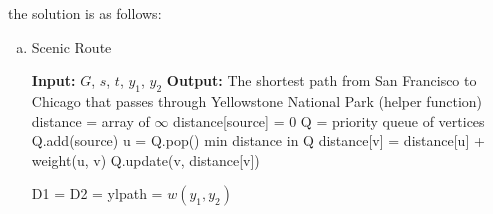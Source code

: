 \documentclass[10pt]{article}
\begin{document}
\begin{solution}
    the solution is as follows:
    \begin{enumerate}[(a)] 
        \item  \begin{algorithm}
            \caption{Scenic Route} 
            \begin{algorithmic}[1]
            \Statex \textbf{Input:} $G$, $s$, $t$, $y_1$, $y_2$
            \Statex \textbf{Output:} The shortest path from San Francisco to Chicago that passes through Yellowstone National Park
            \Statex 
             (helper function)
                \State distance = array of $\infty$ 
                \State distance[source] = 0
                \State Q = priority queue of vertices
                \State Q.add(source)
                    \State u = Q.pop() min distance in Q
                            \State distance[v] = distance[u] + weight(u, v)
                            \State Q.update(v, distance[v])
                        \EndIf
                    \EndFor
                \EndWhile

            \EndFunction
            \Statex
                \State D1 = 
                \State D2 = 
                \State ylpath = $w(y_1, y_2)$


\end{algorithmic}
\end{algorithm}
\end{enumerate}
\end{solution}
\end{document}
